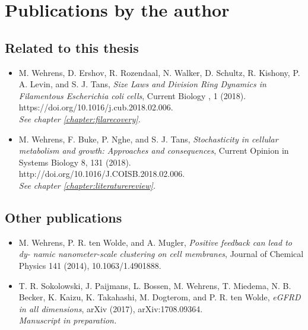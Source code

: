 \chapter*{Publications by the author}


\section*{Related to this thesis}

\begin{itemize}
    \item M. Wehrens, D. Ershov, R. Rozendaal, N. Walker, D. Schultz, R. Kishony, P. A. Levin,
    and S. J. Tans, \textit{Size Laws and Division Ring Dynamics in Filamentous Escherichia coli
    cells}, Current Biology , 1 (2018). \cite{Wehrens2018a} \\
    https://doi.org/10.1016/j.cub.2018.02.006. \\
    \textit{See chapter \ref{chapter:filarecovery}.}
    \item  M. Wehrens, F. Buke, P. Nghe, and S. J. Tans, \textit{Stochasticity in cellular metabolism and
    growth: Approaches and consequences}, Current Opinion in Systems Biology 8, 131
    (2018). \cite{Wehrens2018} \\
    http://doi.org/10.1016/J.COISB.2018.02.006. \\
    \textit{See chapter \ref{chapter:literaturereview}.}
\end{itemize}

\section*{Other publications}

\begin{itemize}
    \item M. Wehrens, P. R. ten Wolde, and A. Mugler, \textit{Positive feedback can lead to dy-
    namic nanometer-scale clustering on cell membranes}, Journal of Chemical Physics
    141 (2014), 10.1063/1.4901888. \cite{Wehrens2014}
    \item T. R. Sokolowski, J. Paijmans, L. Bossen, M. Wehrens, T. Miedema, N. B. Becker,
    K. Kaizu, K. Takahashi, M. Dogterom, and P. R. ten Wolde, \textit{eGFRD in all dimensions},
    arXiv (2017), arXiv:1708.09364. \cite{Sokolowski2017} \\
    \textit{Manuscript in preparation.}
\end{itemize}




















